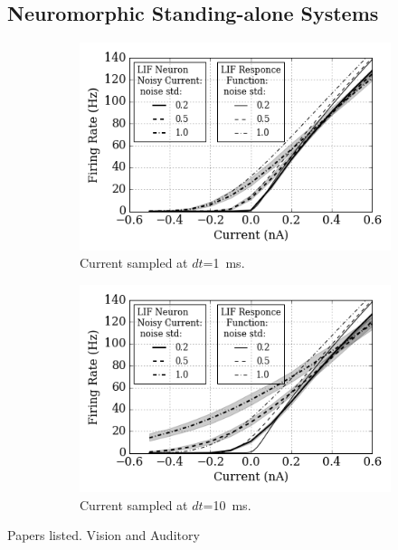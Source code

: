 \subsection{Neuromorphic Standing-alone Systems}
	\begin{figure}[tbp!]
	\centering
	\begin{subfigure}[t]{0.49\textwidth}
		\includegraphics[width=\textwidth]{pics_iconip/2-1.png}
		\caption{Current sampled at $dt$=1~ms.}
	\end{subfigure}
	\begin{subfigure}[t]{0.49\textwidth}
		\includegraphics[width=\textwidth]{pics_iconip/2-10.png}
		\caption{Current sampled at $dt$=10~ms.}
	\end{subfigure}
	\caption{}
	\label{Fig:close-loop}
\end{figure}
Papers listed.
Vision and Auditory
\label{sec:morph}

